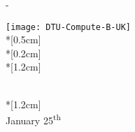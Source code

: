 \thispagestyle{empty}             %
\calccentering{\unitlength}
\begin{adjustwidth*}{\unitlength}{-\unitlength}
    \begin{adjustwidth}{-0.5cm}{-0.5cm}
        \sffamily
        \begin{flushright}
            \thesistypeabbr{}
            \thesistype{}
        \end{flushright}
        \vspace*{\fill}
        \noindent
        \texttt{[image: DTU-Compute-B-UK]}\\*[0.5cm]
        \Huge \thesistitle{}\\*[0.2cm]
        \LARGE \thesissubtitle{}\\*[1.2cm]
        \parbox[b]{0.75\linewidth}{%
            \large 
            \thesisauthor{}\\*[1.2cm]
            \normalsize
            \thesislocation{}\\ January 25\textsuperscript{th} \the\year
        }
    \end{adjustwidth}
\end{adjustwidth*}
\normalfont
\normalsize

